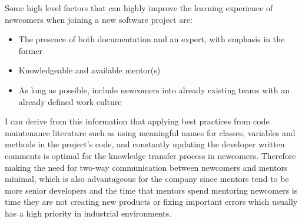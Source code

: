 \documentclass[12pt, letterpaper]{article}
\begin{document}
Some high level factors that can highly improve the learning experience of newcomers when joining a new software 
project are:
\begin{itemize}
  \item The presence of both documentation and an expert, with emphasis in the former
  \item Knowledgeable and available mentor(s)
  \item As long as possible, include newcomers into already existing teams with an already defined work culture 
\end{itemize}

I can derive from this information that applying best practices from code maintenance literature such as 
using meaningful names for classes, variables and methods in the project's code, and constantly updating
the developer written comments is optimal for the knowledge transfer process in newcomers. Therefore making
the need for two-way communication between newcomers and mentors minimal, which is also advantageous for the
company since mentors tend to be more senior developers and the time that mentors spend mentoring newcomers
is time they are not creating new products or fixing important errors which usually has a high priority
in industrial environments.

 




 
\end{document}
